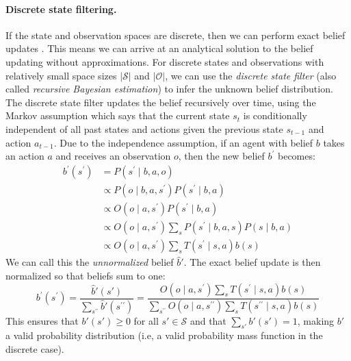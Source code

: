 \paragraph{Discrete state filtering.}
If the state and observation spaces are discrete, then we can perform exact belief updates \cite{dmbook}.
This means we can arrive at an analytical solution to the belief updating without approximations.
For discrete states and observations with relatively small space sizes $|\mathcal{S}|$ and $|\mathcal{O}|$, we can use the \textit{discrete state filter} (also called \textit{recursive Bayesian estimation}) to infer the unknown belief distribution.
The discrete state filter updates the belief recursively over time, using the Markov assumption which says that the current state $s_t$ is conditionally independent of all past states and actions given the previous state $s_{t-1}$ and action $a_{t-1}$.
Due to the independence assumption, if an agent with belief $b$ takes an action $a$ and receives an observation $o$, then the new belief $b^\prime$ becomes:
\begin{align*}
    b^\prime(s^\prime) &= P(s^\prime \mid b, a, o)\\
                       &\propto P(o \mid b, a, s^\prime) P(s^\prime \mid b, a) \tag{Bayes' rule}\\
                       &\propto O(o \mid a, s^\prime) P(s^\prime \mid b, a)\tag{observation definition}\\
                       &\propto O(o \mid a, s^\prime) \sum_s P(s^\prime \mid b, a, s) P(s \mid b, a) \tag{law of total probability}\\
                       &\propto O(o \mid a, s^\prime)\sum_s T(s^\prime \mid s, a)b(s) \tag{state transition model}
\end{align*}
We can call this the \textit{unnormalized} belief $\hat{b}'$. The exact belief update is then normalized so that beliefs sum to one:
\begin{equation}
    b^\prime(s^\prime) = \frac{\hat{b}'(s')}{\sum_{s^{\prime\prime}} \hat{b}'(s^{\prime\prime})} = \frac{O(o \mid a, s^\prime)\sum_s T(s^\prime \mid s, a)b(s)}{\sum_{s^{\prime\prime}} O(o \mid a, s^{\prime\prime}) \sum_s T(s^{\prime\prime} \mid s, a) b(s)}
\end{equation}
This ensures that $b'(s') \ge 0$ for all $s' \in \mathcal{S}$ and that $\sum_{s'} b'(s') = 1$, making $b'$ a valid probability distribution (i.e, a valid probability mass function in the discrete case).

